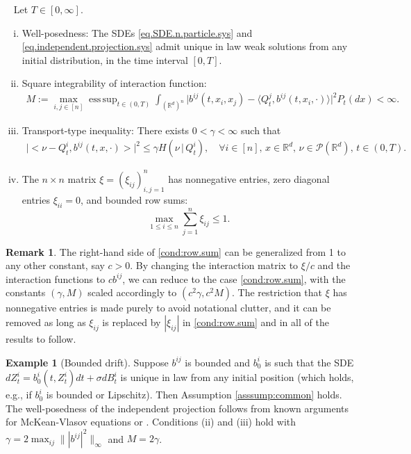 \documentclass[11pt,reqno]{amsart}
\numberwithin{equation}{section}
\theoremstyle{definition}
\newtheorem{example}[theorem]{Example}\newtheorem{definition}[theorem]{Definition}
\newtheorem{remark}[theorem]{Remark}
\newenvironment{manualassum}[1]{%
	\renewcommand\themanualassuminner{#1}%
	\manualassuminner
}{\endmanualassuminner}
\def\P{{\mathcal P}}
\def\R{{\mathbb R}}
\DeclareMathOperator*{\esssup}{ess\,sup}
\begin{document}
\begin{manualassum}{A} \label{asssump:common}


{\ }
Let $T \in [0,\infty]$.
	\begin{enumerate}[(i)] 
		\item Well-posedness: The SDEs \eqref{eq.SDE.n.particle.sys} and \eqref{eq.independent.projection.sys} admit unique in law weak solutions from any initial distribution, in the time interval $[0,T]$.
		\item Square integrability of interaction function: 
		\begin{align*}
			M := \max_{i,j\in[n]} \esssup_{t\in (0,T)} \int_{(\R^d)^n} \big| b^{ij}(t, x_i, x_j) - \big\langle Q^{j}_t, b^{ij}(t, x_i, \cdot)\big\rangle \big|^2 P_t(dx) < \infty.
		\end{align*}
		\item Transport-type inequality: There exists $0 < \gamma < \infty$ such that
		\begin{align} \label{cond.transport.type.ineq}
			\big| \big< \nu - Q^i_t, b^{ij}(t, x, \cdot) \big> \big|^2 \leq \gamma H( \nu \, | \,Q^i_t ), \quad \forall i\in[n],\,  x \in \R^d,\,\nu \in \P(\R^d),\, t \in (0,T).
		\end{align}
		\item
		The  $n\times n$ matrix $\xi =\left(\xi_{ij}\right)_{i,j=1}^{n}$ has nonnegative entries, zero diagonal entries $\xi_{ii}=0$, and bounded row sums:
		\begin{equation} \tag{rows}
			\max_{1\leq i\leq n} \sum_{j=1}^n \xi_{ij} \leq 1. \label{cond:row.sum}
		\end{equation}
	\end{enumerate}	
\end{manualassum}


\begin{remark} \label{re:row.sum}
The right-hand side of \eqref{cond:row.sum} can be generalized from 1 to any other constant, say $c > 0$. By changing the interaction matrix to $\xi/c$ and the interaction functions to $c b^{ij}$, we can reduce to the case \eqref{cond:row.sum}, with the constants $(\gamma,M)$ scaled accordingly to $(c^2\gamma,c^2M)$.
The restriction that $\xi$ has nonnegative entries is made purely to avoid notational clutter, and it can be removed as long as $\xi_{ij}$ is replaced by $|\xi_{ij}|$ in \eqref{cond:row.sum} and in all of the results to follow.
\end{remark}

\begin{example}[Bounded drift] \label{ex:bounded}
Suppose $b^{ij}$ is bounded  and $b_0^i$ is such that the SDE $dZ_t^i = b_0^i(t,Z_t^i)dt + \sigma dB_t^i$ is unique in law from any initial position (which holds, e.g., if $b_0^i$ is bounded or Lipschitz). Then Assumption \ref{asssump:common} holds. The well-posedness of the independent projection follows from known arguments for McKean-Vlasov equations \cite[Theorem 2.5]{lacker2018strong} or \cite[Theorem 2]{mishura2020existence}. Conditions (ii) and (iii) hold with $\gamma = 2\max_{ij}\||b^{ij}|^2\|_\infty$ and $M=2\gamma$.
\end{example}
\end{document}
